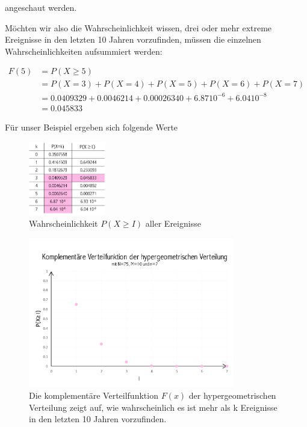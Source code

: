 \begin{refsection}
angeschaut werden.

Möchten wir also die Wahrscheinlichkeit wissen, drei oder mehr extreme Ereignisse in den letzten 10 Jahren vorzufinden, müssen die einzelnen Wahrscheinlichkeiten aufsummiert werden:

\begin{align*}
F(5) &=  P(X {\ge} 5) \\
&= P(X = 3) + P(X = 4) + P(X = 5) + P(X = 6) + P(X = 7) \\
&= 0.0409329 + 0.0046214 + 0.00026340 + 6.87 10^{ -6 } + 6.04 10^{ -8 } \\
&= 0.045833
\end{align*}

Für unser Beispiel ergeben sich folgende Werte

\begin{figure}[htbp]
\centering
\includegraphics[width=0.3\textwidth]{extrem/TabExt.pdf}
\caption{Wahrscheinlichkeit $P(X \ge I)$ aller Ereignisse}
\label{TabExt}
\end{figure}

\begin{figure}[htbp]
\centering
\includegraphics[width=0.8\textwidth]{extrem/HyperExt.pdf}
\caption{Die komplementäre Verteilfunktion $F(x)$ der hypergeometrischen Verteilung zeigt auf, wie wahrscheinlich es ist mehr als k Ereignisse in den letzten 10 Jahren vorzufinden.}
\label{HyperExt}
\end{figure}



\end{refsection}

